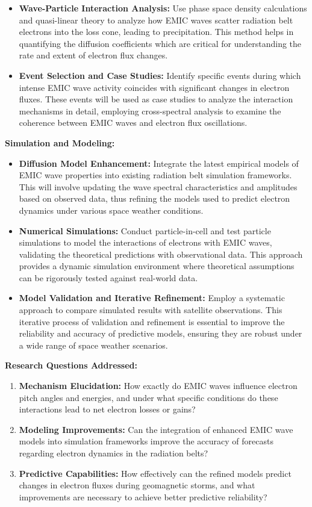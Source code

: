 \documentclass[
  letterpaper,
  DIV=11,
  numbers=noendperiod]{scrartcl}
\providecommand{\tightlist}{%
  \setlength{\itemsep}{0pt}\setlength{\parskip}{0pt}}\usepackage{longtable,booktabs,array}
\begin{document}
\begin{itemize}
\item
  \textbf{Wave-Particle Interaction Analysis:} Use phase space density calculations and quasi-linear theory to analyze how EMIC waves scatter radiation belt electrons into the loss cone, leading to precipitation. This method helps in quantifying the diffusion coefficients which are critical for understanding the rate and extent of electron flux changes.
\item
  \textbf{Event Selection and Case Studies:} Identify specific events during which intense EMIC wave activity coincides with significant changes in electron fluxes. These events will be used as case studies to analyze the interaction mechanisms in detail, employing cross-spectral analysis to examine the coherence between EMIC waves and electron flux oscillations.
\end{itemize}

\textbf{Simulation and Modeling:}

\begin{itemize}
\item
  \textbf{Diffusion Model Enhancement:} Integrate the latest empirical models of EMIC wave properties into existing radiation belt simulation frameworks. This will involve updating the wave spectral characteristics and amplitudes based on observed data, thus refining the models used to predict electron dynamics under various space weather conditions.
\item
  \textbf{Numerical Simulations:} Conduct particle-in-cell and test particle simulations to model the interactions of electrons with EMIC waves, validating the theoretical predictions with observational data. This approach provides a dynamic simulation environment where theoretical assumptions can be rigorously tested against real-world data.
\item
  \textbf{Model Validation and Iterative Refinement:} Employ a systematic approach to compare simulated results with satellite observations. This iterative process of validation and refinement is essential to improve the reliability and accuracy of predictive models, ensuring they are robust under a wide range of space weather scenarios.
\end{itemize}

\textbf{Research Questions Addressed:}

\begin{enumerate}
\def\labelenumi{\arabic{enumi}.}
\tightlist
\item
  \textbf{Mechanism Elucidation:} How exactly do EMIC waves influence electron pitch angles and energies, and under what specific conditions do these interactions lead to net electron losses or gains?
\item
  \textbf{Modeling Improvements:} Can the integration of enhanced EMIC wave models into simulation frameworks improve the accuracy of forecasts regarding electron dynamics in the radiation belts?
\item
  \textbf{Predictive Capabilities:} How effectively can the refined models predict changes in electron fluxes during geomagnetic storms, and what improvements are necessary to achieve better predictive reliability?
\end{enumerate}
\end{document}
